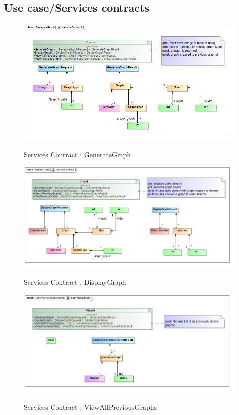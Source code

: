 \documentclass[a4paper,12pt]{article}
\begin{document}
\subsection{Use case/Services contracts}
	\begin{figure}[H]
		\includegraphics[width=\textwidth]{Images/class__GenerateGraph__serviceContract.png}  \\
		\caption{Services Contract : GenerateGraph}
	\end{figure}
	\begin{figure}[H]
		\includegraphics[width=\textwidth]{Images/class__DisplayGraph__serviceContract.png}  \\
		\caption{Services Contract : DisplayGraph}
	\end{figure}
	\begin{figure}[H]
		\includegraphics[width=\textwidth]{Images/class__ViewAllPreviousGraphs__serviceContract.png}  \\
		\caption{Services Contract : ViewAllPreviousGraphs}
	\end{figure}
	
\end{document}

